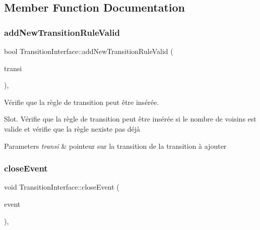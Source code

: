 \subsection{Member Function Documentation}
\mbox{\label{class_transition_interface_a34707c10737235a26a7cd818f9574109}} 
\subsubsection{\texorpdfstring{add\+New\+Transition\+Rule\+Valid}{addNewTransitionRuleValid}}
{\footnotesize\ttfamily bool Transition\+Interface\+::add\+New\+Transition\+Rule\+Valid (\begin{DoxyParamCaption}\item[{\mbox{\hyperlink{class_transition}{Transition}} $\ast$}]{transi }\end{DoxyParamCaption})\hspace{0.3cm}{\ttfamily [protected]}, {\ttfamily [slot]}}



Vérifie que la règle de transition peut être insérée. 

Slot. Vérifie que la règle de transition peut être insérée si le nombre de voisins est valide et vérifie que la règle n\textquotesingle{}existe pas déjà 
\begin{DoxyParams}{Parameters}
{\em transi} & pointeur sur la transition de la transition à ajouter \\
\hline
\end{DoxyParams}
\mbox{\label{class_transition_interface_a881a8911074ffa7c15b03958575fd331}} 
\subsubsection{\texorpdfstring{close\+Event}{closeEvent}}
{\footnotesize\ttfamily void Transition\+Interface\+::close\+Event (\begin{DoxyParamCaption}\item[{Q\+Close\+Event $\ast$}]{event }\end{DoxyParamCaption})\hspace{0.3cm}{\ttfamily [protected]}, {\ttfamily [slot]}}



